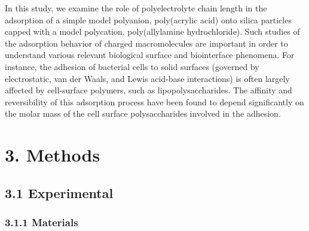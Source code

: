 \documentclass[journal=mamobx,manuscript=article]{achemso}
\begin{document}
In this study, we examine the role of polyelectrolyte chain length in the adsorption of a simple model polyanion, poly(acrylic acid) onto silica particles capped with a model polycation, poly(allylamine hydrochloride).  Such studies of the adsorption behavior of charged macromolecules are important in order to understand various relevant biological surface and biointerface phenomena.  For instance, the adhesion of bacterial cells to solid surfaces (governed by electrostatic, van der Waals, and Lewis acid-base interactions) is often largely affected by cell-surface polymers, such as lipopolysaccharides.\cite{Jucker1997}  The affinity and reversibility of this adsorption process have been found to depend significantly on the molar mass of the cell surface polysaccharides involved in the adhesion.\cite{Jucker1997} 

\section{3. Methods}

\subsection{3.1 Experimental}

\subsubsection{3.1.1 Materials}
\end{document}
